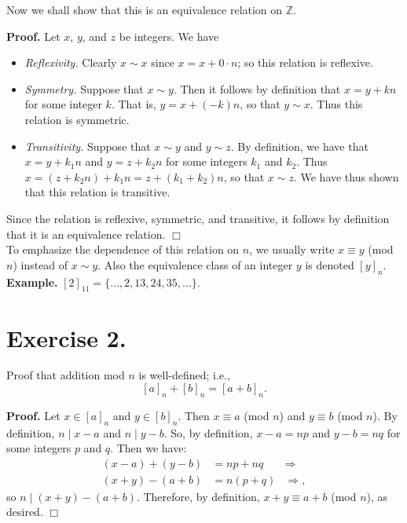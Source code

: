\documentclass{article}
\newcommand{\qed}{\hfill \ensuremath{\Box}}
\newcommand{\Z}{\mathbb{Z}}
\begin{document}
   Now we shall show that this is an equivalence relation on $\Z$.

   \textbf{Proof.} Let $x$, $y$, and $z$ be integers. We have
   \begin{itemize}
      \item \textit{Reflexivity.} Clearly $x \sim x$ since $x = x + 0\cdot n$;
            so this relation is reflexive.
      \item \textit{Symmetry.} Suppose that $x \sim y$. Then it follows by
            definition that $x = y + kn$ for some integer $k$. That is,
            $y = x + (-k)n$, so that $y \sim x$. Thus this relation is
            symmetric.
      \item \textit{Transitivity.} Suppose that $x \sim y$ and $y \sim z$. By
            definition, we have that $x = y + k_1n$ and $y = z + k_2n$ for some
            integers $k_1$ and $k_2$. Thus
            $x = (z + k_2n) + k_1n = z + (k_1 + k_2)n$, so that $x \sim z$. We
            have thus shown that this relation is transitive.
   \end{itemize}

   Since the relation is reflexive, symmetric, and transitive, it follows by
   definition that it is an equivalence relation. \qed \\

   To emphasize the dependence of this relation on $n$, we 
   usually write $x \equiv y$ (mod $n$) instead of $x \sim y$. Also the 
   equivalence class of an integer $y$ is denoted $[y]_n$. \\

   \textbf{Example.} $[2]_{11} = \{\ldots, 2, 13, 24, 35, \ldots\}$.

   \section*{Exercise 2.} Proof that addition mod $n$ is well-defined; i.e.,
   $$[a]_n + [b]_n = [a + b]_n.$$

   \textbf{Proof.} Let $x \in [a]_n$ and $y \in [b]_n$. Then
   $x \equiv a$ (mod $n$) and $y \equiv b$ (mod $n$). By definition,
   $n \mid x - a$ and $n \mid y - b$. So, by definition, $x - a = np$ and
   $y - b = nq$ for some integers $p$ and $q$. Then we have:
   \begin{align*}
      (x - a) + (y - b) &= np + nq &\Rightarrow \\
      (x + y) - (a + b) &= n(p + q) &\Rightarrow,
   \end{align*}
   so $n \mid (x + y) - (a + b)$. Therefore, by definition,
   $x + y \equiv a + b$ (mod $n$), as desired. \qed
\end{document}
